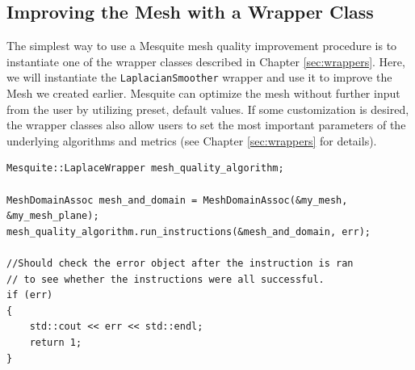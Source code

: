 \subsection{Improving the Mesh with a Wrapper Class}
\label{sec:tutWrapper}
The simplest way to use a Mesquite mesh quality improvement
procedure is to instantiate one of the wrapper classes described in Chapter
\ref{sec:wrappers}. Here, we will instantiate the
\texttt{LaplacianSmoother} wrapper and use it to improve
the Mesh we created earlier.  Mesquite can optimize the mesh
without further input from the user by utilizing preset, default
values.  If some customization is desired, the wrapper classes also
allow users to set the most important parameters of the underlying
algorithms and metrics (see Chapter
\ref{sec:wrappers} for details).
\begin{verbatim}
Mesquite::LaplaceWrapper mesh_quality_algorithm;

MeshDomainAssoc mesh_and_domain = MeshDomainAssoc(&my_mesh, &my_mesh_plane);
mesh_quality_algorithm.run_instructions(&mesh_and_domain, err);

//Should check the error object after the instruction is ran
// to see whether the instructions were all successful.
if (err)
{
    std::cout << err << std::endl;
    return 1;
}
\end{verbatim}


